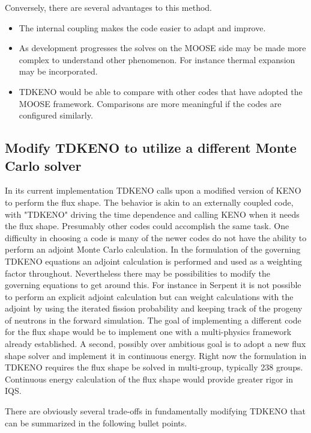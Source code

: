 \documentclass[11pt]{article}
\begin{document}
Conversely, there are several advantages to this method.
\begin{itemize}
    \item The internal coupling makes the code easier to adapt and improve. 
    \item As development progresses the solves on the MOOSE side may be made more complex to understand other phenomenon. For instance thermal expansion may be incorporated.  
    \item TDKENO would be able to compare with other codes that have adopted the MOOSE framework.  Comparisons are more meaningful if the codes are configured similarly. 
\end{itemize}

\subsection{Modify TDKENO to utilize a different Monte Carlo solver}
	In its current implementation TDKENO  calls upon a modified version of KENO to perform the flux shape.  The behavior is akin to an externally coupled code, with "TDKENO" driving the time dependence and calling KENO when it needs the flux shape. Presumably other codes could accomplish the same task.  One difficulty in choosing a code is many of the newer codes do not have the ability to perform an adjoint Monte Carlo calculation. In the  formulation of the governing TDKENO equations an adjoint calculation is performed and used as a weighting factor throughout.  Nevertheless there may be possibilities to modify the governing equations to get around this. For instance in Serpent it is not possible to perform an explicit adjoint calculation but can weight calculations with the adjoint by using the iterated fission probability and keeping track of the progeny of neutrons in the forward simulation.  The goal of implementing a different code for the flux shape would be to implement one with a multi-physics framework already established.  A second, possibly over ambitious goal is to adopt a new flux shape solver and implement it in continuous energy.  Right now the formulation in TDKENO requires the flux shape be solved in multi-group, typically 238 groups.  Continuous energy calculation of the flux shape would provide greater rigor in IQS.  
	
	There are obviously several trade-offs in fundamentally modifying TDKENO that can be summarized in the following bullet points.
	
\end{document}
